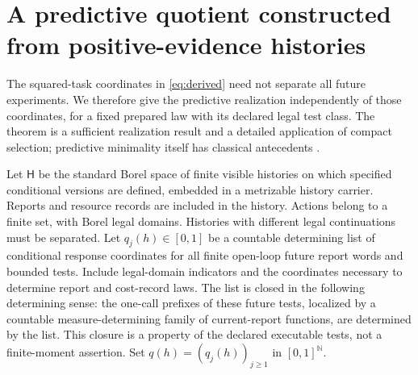 \section{A predictive quotient constructed from positive-evidence histories}\label{sec:quotient}
The squared-task coordinates in \eqref{eq:derived} need not separate all future experiments. We therefore give the predictive realization independently of those coordinates, for a fixed prepared law with its declared legal test class. The theorem is a sufficient realization result and a detailed application of compact selection; predictive minimality itself has classical antecedents \cite{SC,BC}.

Let $\mathsf H$ be the standard Borel space of finite visible histories on which specified conditional versions are defined, embedded in a metrizable history carrier. Reports and resource records are included in the history. Actions belong to a finite set, with Borel legal domains. Histories with different legal continuations must be separated. Let $q_j(h)\in[0,1]$ be a countable determining list of conditional response coordinates for all finite open-loop future report words and bounded tests. Include legal-domain indicators and the coordinates necessary to determine report and cost-record laws. The list is closed in the following determining sense: the one-call prefixes of these future tests, localized by a countable measure-determining family of current-report functions, are determined by the list. This closure is a property of the declared executable tests, not a finite-moment assertion. Set $q(h)=(q_j(h))_{j\ge1}$ in $[0,1]^{\mathbb N}$.

